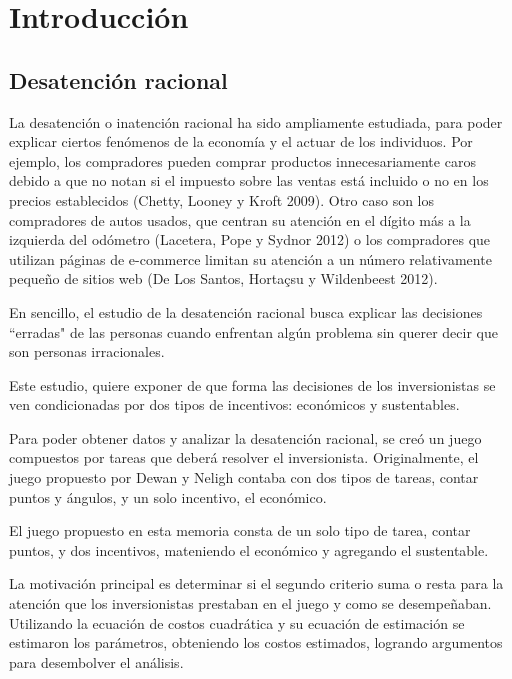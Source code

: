 \documentclass[11pt,letterpaper]{article}
\begin{document}

\tableofcontents
\newpage


\section{Introducción}

\subsection{Desatención racional}

La desatención o inatención racional ha sido ampliamente estudiada, para poder explicar ciertos fenómenos de la economía y el actuar de los individuos. Por ejemplo, los compradores pueden comprar productos innecesariamente caros debido a que no notan si el impuesto sobre las ventas está incluido o no en los precios establecidos (Chetty, Looney y Kroft 2009). Otro caso son los compradores de autos usados, que centran su atención en el dígito más a la izquierda del odómetro (Lacetera, Pope y Sydnor 2012) o los compradores que utilizan páginas de e-commerce limitan su atención a un número relativamente pequeño de sitios web (De Los Santos, Hortaçsu y Wildenbeest 2012).

En sencillo, el estudio de la desatención racional busca explicar las decisiones ``erradas" de las personas cuando enfrentan algún problema sin querer decir que son personas irracionales. 

Este estudio, quiere exponer de que forma las decisiones de los inversionistas se ven condicionadas por dos tipos de incentivos: económicos y sustentables.

Para poder obtener datos y analizar la desatención racional, se creó un juego compuestos por tareas que deberá resolver el inversionista. Originalmente, el juego propuesto por Dewan y Neligh contaba con dos tipos de tareas, contar puntos y ángulos,  y un solo incentivo, el económico. 

El juego propuesto en esta memoria consta de un solo tipo de tarea, contar puntos, y dos incentivos, mateniendo el económico y agregando el sustentable.

La motivación principal es determinar si el segundo criterio suma o resta para la atención que los inversionistas prestaban en el juego y como se desempeñaban. Utilizando la ecuación de costos cuadrática y su ecuación de estimación se estimaron los parámetros, obteniendo los costos estimados, logrando argumentos para desembolver el análisis.
\end{document}
